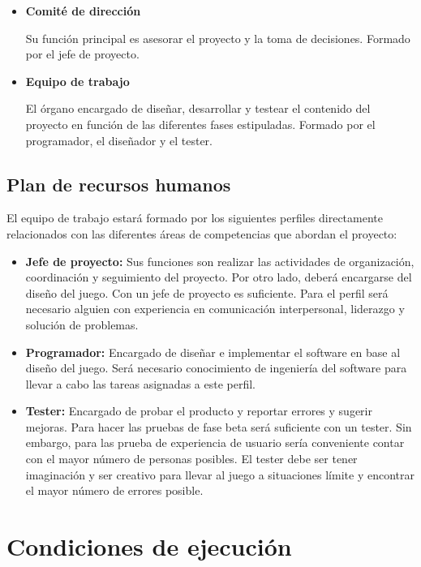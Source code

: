 			\begin{itemize}
				\item \textbf{Comité de dirección}

				Su función principal es asesorar el proyecto y la toma de decisiones. Formado por el jefe de proyecto.
				\item \textbf{Equipo de trabajo}

				El órgano encargado de diseñar, desarrollar y testear el contenido del proyecto en función de las diferentes fases estipuladas. Formado por el programador, el diseñador y el tester.
			\end{itemize}

		\subsection{Plan de recursos humanos}

			\label{sec:planRecursosHumanos}

			El equipo de trabajo estará formado por los siguientes perfiles directamente relacionados con las diferentes áreas de competencias que abordan el proyecto:

			\begin{itemize}
				\item \textbf{Jefe de proyecto:}
				Sus funciones son realizar las actividades de organización, coordinación y seguimiento del proyecto. Por otro lado, deberá encargarse del diseño del juego. Con un jefe de proyecto es suficiente. Para el perfil será necesario alguien con experiencia en comunicación interpersonal, liderazgo y solución de problemas.
				\item \textbf{Programador:}
				Encargado de diseñar e implementar el software en base al diseño del 	juego. Será necesario conocimiento de ingeniería del software para llevar a cabo las tareas asignadas a este perfil.
				\item \textbf{Tester:}
				Encargado de probar el producto y reportar errores y sugerir mejoras. 	Para hacer las 	pruebas de fase beta será suficiente con un tester. 	Sin embargo, para las prueba de 	experiencia de usuario sería 	conveniente contar con el mayor número de personas 	posibles. El tester debe ser tener imaginación y ser creativo para llevar al juego a situaciones límite y encontrar el mayor número de errores posible.
			\end{itemize}

	\section{Condiciones de ejecución}

